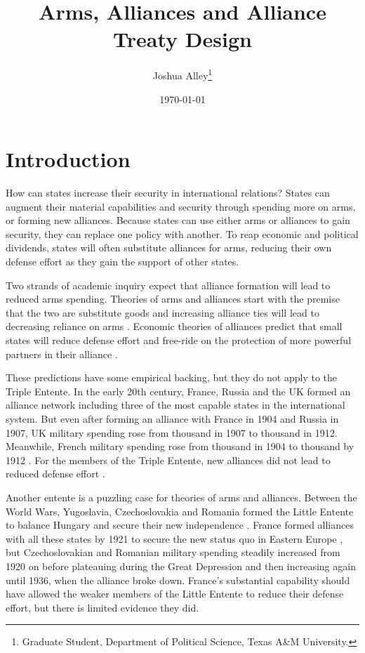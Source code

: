 \documentclass[12pt]{article}
\title{\textbf{Arms, Alliances and Alliance Treaty Design}}
\author{Joshua Alley\footnote{Graduate Student,
Department of Political Science, Texas A\&M University.}}
\date{{\normalsize \today}}
\begin{document}
\maketitle 

\newpage 

\doublespace 



\section*{Introduction}

How can states increase their security in international relations? States can augment their material capabilities and security through spending more on arms, or forming new alliances. Because states can use either arms or alliances to gain security, they can replace one policy with another. To reap economic and political dividends, states will often substitute alliances for arms, reducing their own defense effort as they gain the support of other states. 

Two strands of academic inquiry expect that alliance formation will lead to reduced arms spending. Theories of arms and alliances start with the premise that the two are substitute goods and increasing alliance ties will lead to decreasing reliance on arms \citep{Morrow1993, Sorokin1994, DigiuseppePoast2016}. Economic theories of alliances predict that small states will reduce defense effort and free-ride on the protection of more powerful partners in their alliance \citep{OlsonZeckhauser1966, SandlerHartley2001}. 

These predictions have some empirical backing, but they do not apply to the Triple Entente. In the early 20th century, France, Russia and the UK formed an alliance network including three of the most capable states in the international system. But even after forming an alliance with France in 1904 and Russia in 1907, UK military spending rose from  thousand in 1907 to  thousand in 1912. Meanwhile, French military spending rose from  thousand  in 1904 to  thousand by 1912 \citep{SingerCINC1988}. For the members of the Triple Entente, new alliances did not lead to reduced defense effort \citep{Schmitt1924}. 

Another entente is a puzzling case for theories of arms and alliances. Between the World Wars, Yugoslavia, Czechoslovakia and Romania formed the Little Entente to balance Hungary and secure their new independence \citep{Benes1922, Osusky1934}. France formed alliances with all these states by 1921 to secure the new status quo in Eastern Europe \citep[pg. 142-3]{Crane1931}, but Czechoslovakian and Romanian military spending steadily increased from 1920 on before plateauing during the Great Depression and then increasing again until 1936, when the alliance broke down. France's substantial capability should have allowed the weaker members of the Little Entente to reduce their defense effort, but there is limited evidence they did. 
\end{document}
